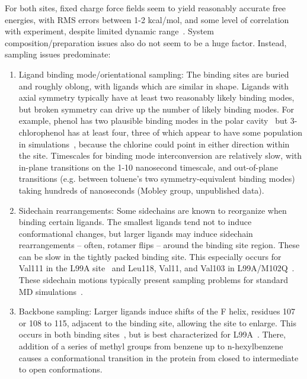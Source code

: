 \documentclass[aps,pre,twocolumn,nofootinbib,superscriptaddress,10pt, final,tightenlines]{revtex4-1}
\begin{document}
For both sites, fixed charge force fields seem to yield reasonably accurate free energies, with RMS errors between 1-2 kcal/mol, and some level of correlation with experiment, despite limited dynamic range~\cite{deng_calculation_2006, mobley_predicting_2007, boyce_predicting_2009, gallicchio_binding_2010, wang_identifying_2013}. 
System composition/preparation issues also do not seem to be a huge factor.
Instead, sampling issues predominate:
\begin{enumerate}

\item{Ligand binding mode/orientational sampling: The binding sites are buried and roughly oblong, with ligands which are similar in shape. 
Ligands with axial symmetry typically have at least two reasonably likely binding modes, but broken symmetry can drive up the number of likely binding modes. 
For example, phenol has two plausible binding modes in the polar cavity~\cite{graves_rescoring_2008, boyce_predicting_2009} but 3-chlorophenol has at least four, three of which appear to have some population in simulations~\cite{gallicchio_binding_2010}, because the chlorine could point in either direction within the site. 
Timescales for binding mode interconversion are relatively slow, with in-plane transitions on the 1-10 nanosecond timescale, and out-of-plane transitions (e.g. between toluene's two symmetry-equivalent binding modes) taking hundreds of nanoseconds (Mobley group, unpublished data).}

\item{Sidechain rearrangements: Some sidechains are known to reorganize when binding certain ligands. 
The smallest ligands tend not to induce conformational changes, but larger ligands may induce sidechain rearrangements -- often, rotamer flips -- around the binding site region. 
These can be slow in the tightly packed binding site. 
This especially occurs for Val111 in the L99A site~\cite{morton_specificity_1995, mobley_confine_2007, jiang_free_2010} and Leu118, Val11, and Val103 in L99A/M102Q~\cite{wei_model_2002, wei_testing_2004, graves_rescoring_2008, boyce_predicting_2009}. 
These sidechain motions typically present sampling problems for standard MD simulations~\cite{mobley_confine_2007, mobley_predicting_2007, boyce_predicting_2009, jiang_free_2010, wang_achieving_2012}.
}

\item{Backbone sampling: 
Larger ligands induce shifts of the F helix, residues 107 or 108 to 115, adjacent to the binding site, allowing the site to enlarge.
This occurs in both binding sites~\cite{wei_testing_2004, boyce_predicting_2009, merski_homologous_2015}, but is best characterized for L99A~\cite{merski_homologous_2015}.
There, addition of a series of methyl groups from benzene up to n-hexylbenzene causes a conformational transition in the protein from closed to intermediate to open conformations.
}
\end{enumerate}
\end{document}
